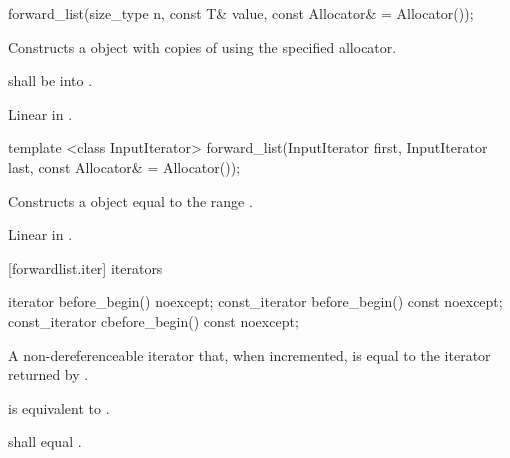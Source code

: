 %
%
\begin{itemdecl}
forward_list(size_type n, const T& value, const Allocator& = Allocator());
\end{itemdecl}

\begin{itemdescr}
\pnum
\effects Constructs a  object with  copies of  using the specified allocator.

\pnum
\requires {} shall be  into .

\pnum
\complexity Linear in .
\end{itemdescr}

%
%
\begin{itemdecl}
template <class InputIterator>
  forward_list(InputIterator first, InputIterator last, const Allocator& = Allocator());
\end{itemdecl}

\begin{itemdescr}
\pnum
\effects Constructs a  object equal to the range .

\pnum
\complexity Linear in .
\end{itemdescr}

[forwardlist.iter]{ iterators}

%
%
%
%
\begin{itemdecl}
iterator before_begin() noexcept;
const_iterator before_begin() const noexcept;
const_iterator cbefore_begin() const noexcept;
\end{itemdecl}

\begin{itemdescr}
\pnum
\returns A non-dereferenceable iterator that, when incremented, is equal to the iterator
returned by .

\pnum
\effects {} is equivalent to
.

\pnum
\remarks {} shall equal .
\end{itemdescr}

